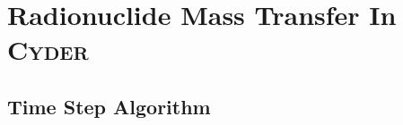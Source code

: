 
\section{Radionuclide Mass Transfer In \textsc{Cyder}}\label{sec:nuclide_models}


\subsection{Time Step Algorithm}\label{sec:timestep}









